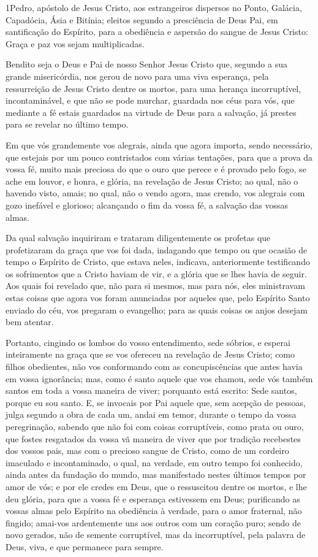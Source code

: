 
\lettrine{1} Pedro, apóstolo de Jesus Cristo, aos estrangeiros
dispersos no Ponto, Galácia, Capadócia, Ásia e Bitínia; eleitos
segundo a presciência de Deus Pai, em santificação do Espírito, para
a obediência e aspersão do sangue de Jesus Cristo: Graça e paz vos
sejam multiplicadas.

Bendito seja o Deus e Pai de nosso Senhor Jesus Cristo que,
segundo a sua grande misericórdia, nos gerou de novo para uma viva
esperança, pela ressurreição de Jesus Cristo dentre os mortos,
para uma herança incorruptível, incontaminável, e que não se
pode murchar, guardada nos céus para vós, que mediante a fé
estais guardados na virtude de Deus para a salvação, já prestes para
se revelar no último tempo.

Em que vós grandemente vos alegrais, ainda que agora importa,
sendo necessário, que estejais por um pouco contristados com várias
tentações, para que a prova da vossa fé, muito mais preciosa do
que o ouro que perece e é provado pelo fogo, se ache em louvor, e
honra, e glória, na revelação de Jesus Cristo; ao qual, não o
havendo visto, amais; no qual, não o vendo agora, mas crendo, vos
alegrais com gozo inefável e glorioso; alcançando o fim da vossa
fé, a salvação das vossas almas.

Da qual salvação inquiriram e trataram diligentemente os profetas
que profetizaram da graça que vos foi dada, indagando que
tempo ou que ocasião de tempo o Espírito de Cristo, que estava
neles, indicava, anteriormente testificando os sofrimentos que a
Cristo haviam de vir, e a glória que se lhes havia de seguir.
Aos quais foi revelado que, não para si mesmos, mas para nós,
eles ministravam estas coisas que agora vos foram anunciadas por
aqueles que, pelo Espírito Santo enviado do céu, vos pregaram o
evangelho; para as quais coisas os anjos desejam bem atentar.

Portanto, cingindo os lombos do vosso entendimento, sede sóbrios,
e esperai inteiramente na graça que se vos ofereceu na revelação de
Jesus Cristo; como filhos obedientes, não vos conformando com
as concupiscências que antes havia em vossa ignorância; mas,
como é santo aquele que vos chamou, sede vós também santos em toda a
vossa maneira de viver; porquanto está escrito: Sede santos,
porque eu sou santo. E, se invocais por Pai aquele que, sem
acepção de pessoas, julga segundo a obra de cada um, andai em temor,
durante o tempo da vossa peregrinação, sabendo que não foi
com coisas corruptíveis, como prata ou ouro, que fostes resgatados
da vossa vã maneira de viver que por tradição recebestes dos vossos
pais, mas com o precioso sangue de Cristo, como de um
cordeiro imaculado e incontaminado, o qual, na verdade, em
outro tempo foi conhecido, ainda antes da fundação do mundo, mas
manifestado nestes últimos tempos por amor de vós; e por ele
credes em Deus, que o ressuscitou dentre os mortos, e lhe deu
glória, para que a vossa fé e esperança estivessem em Deus;
purificando as vossas almas pelo Espírito na obediência à
verdade, para o amor fraternal, não fingido; amai-vos ardentemente
uns aos outros com um coração puro; sendo de novo gerados,
não de semente corruptível, mas da incorruptível, pela palavra de
Deus, viva, e que permanece para sempre.

